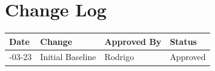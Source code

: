 \documentclass[
]{report}
\author{}
\date{}
\newcounter{none} %
\begin{document}
\newcommand{\theProjectName}{NOAA}
\newcommand{\theAuthor}{Rodrigo Souza dos Santos}

\chapter{Change Log}\label{change-log}

{\def\LTcaptype{none} %
\begin{longtable}[]{@{}llll@{}}
\toprule\noalign{}
Date & Change & Approved By & Status \\
\midrule\noalign{}
\endhead
\bottomrule\noalign{}
\endlastfoot
2026-03-23 & Initial Baseline & Rodrigo & Approved \\
\end{longtable}
}
\end{document}
